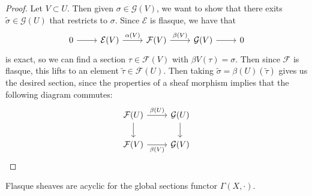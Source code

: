 \begin{proof}
Let $V \subset U$. Then given $\sigma \in \mathcal{G}(V)$, we want to show that
there exits $\widetilde{\sigma} \in \mathcal{G}(U)$ that restricts to $\sigma$. Since
$\mathcal{E}$ is flasque, we have that
\[\begin{tikzcd}
0 \ar[r] & \mathcal{E}(V) \ar[r, "\alpha(V)"] & \mathcal{F}(V) \ar[r,"\beta(V)"]
& \mathcal{G}(V) \ar[r] & 0
\end{tikzcd}\]
is exact, so we can find a section $\tau \in \mathcal{F}(V)$ with
$\beta{V}(\tau) = \sigma$. Then since $\mathcal{F}$ is flasque, this lifts to
an element $\widetilde{\tau} \in \mathcal{F}(U)$. Then taking
$\widetilde{\sigma} = \beta(U)(\widetilde{\tau})$ gives us the desired section, since
the properties of a sheaf morphism implies that the following diagram commutes:
\[\begin{tikzcd}
\mathcal{F}(U) \ar[r, "\beta(U)"] \ar[d] & \mathcal{G}(U) \ar[d] \\
\mathcal{F}(V) \ar[r, "\beta(V)"'] & \mathcal{G}(V)
\end{tikzcd}\]
\end{proof}
%
\begin{prop}
Flasque sheaves are acyclic for the global sections functor $\Gamma(X, \cdot)$.
\end{prop}
%
